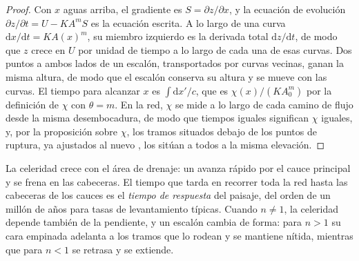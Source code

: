 \begin{proof}
Con $x$ aguas arriba, el gradiente es $S = \partial z/\partial x$, y la
ecuación de evolución $\partial z/\partial t = U - K A^m S$ es la ecuación
escrita. A lo largo de una curva $\mathrm{d}x/\mathrm{d}t = K A(x)^m$, su miembro izquierdo
es la derivada total $\mathrm{d}z/\mathrm{d}t$, de modo que $z$ crece en $U$ por
unidad de tiempo a lo largo de cada una de esas curvas. Dos puntos a ambos lados de un escalón,
transportados por curvas vecinas, ganan la misma altura, de modo que el escalón conserva
su altura y se mueve con las curvas. El tiempo para alcanzar $x$ es
$\int \mathrm{d}x'/c$, que es $\chi(x)/(K A_0^m)$ por la definición de
$\chi$ con $\theta = m$. En la red, $\chi$ se mide a lo largo de cada
camino de flujo desde la misma desembocadura, de modo que tiempos iguales significan $\chi$ iguales, y, por
la proposición sobre $\chi$, los tramos situados debajo de los puntos de ruptura, ya
ajustados al nuevo , los sitúan a todos a la misma elevación.
\end{proof}

La celeridad crece con el área de drenaje: un  avanza rápido por el
cauce principal y se frena en las cabeceras. El tiempo que tarda en recorrer toda la
red hasta las cabeceras de los cauces es el \emph{tiempo de respuesta} del paisaje,
del orden de un millón de años para tasas de levantamiento típicas. Cuando $n \ne 1$,
la celeridad depende también de la pendiente, y un escalón cambia de forma: para $n >
1$ su cara empinada adelanta a los tramos que lo rodean y se mantiene nítida, mientras que para $n <
1$ se retrasa y se extiende.

